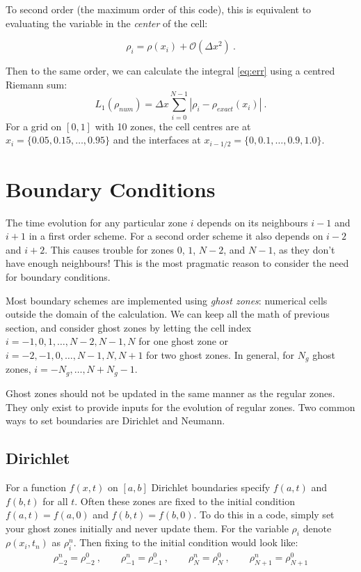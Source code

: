 \documentclass{article}
\begin{document}
To second order (the maximum order of this code), this is equivalent to evaluating the variable in the \emph{center} of the cell:

\begin{equation}
	\rho_i = \rho\left(x_i \right) + \mathcal{O}\left(\Delta x^2\right)\ .
\end{equation}

Then to the same order, we can calculate the integral \eqref{eq:err} using a centred Riemann sum:
\begin{equation}
	L_1(\rho_{num}) = \Delta x \sum_{i=0}^{N-1} \left| \rho_i - \rho_{exact}\left(x_i\right)\right| \ .
\end{equation}
For a grid on $[0,1]$ with 10 zones, the cell centres are at $x_i = \{ 0.05, 0.15, \dots, 0.95\}$ and the interfaces at $x_{i-1/2} = \{0,0.1,\dots, 0.9, 1.0 \}$.

\section{Boundary Conditions}

The time evolution for any particular zone $i$ depends on its neighbours $i-1$ and $i+1$ in a first order scheme.  For a second order scheme it also depends on $i-2$ and $i+2$.  This causes trouble for zones $0$, $1$, $N-2$, and $N-1$, as they don't have enough neighbours!  This is the most pragmatic reason to consider the need for boundary conditions.

Most boundary schemes are implemented using \emph{ghost zones}: numerical cells outside the domain of the calculation.  We can keep all the math of previous section, and consider ghost zones by letting the cell index $i = -1,0,1,\dots,N-2,N-1,N$ for one ghost zone or $i = -2,-1,0,\dots,N-1,N,N+1$ for two ghost zones.  In general, for $N_g$ ghost zones, $i=-N_g, \dots, N+N_g-1$.

Ghost zones should not be updated in the same manner as the regular zones. They only exist to provide inputs for the evolution of regular zones. Two common ways to set boundaries are Dirichlet and Neumann.

\subsection{Dirichlet}

For a function $f(x,t)$ on $[a,b]$ Dirichlet boundaries specify $f(a,t)$ and $f(b,t)$ for all $t$. Often these zones are fixed to the initial condition $f(a,t) =f(a,0)$ and $f(b,t) = f(b,0)$.  To do this in a code, simply set your ghost zones initially and never update them.  For the variable $\rho_i$ denote $\rho(x_i,t_n)$ as $\rho_i^n$.  Then fixing to the initial condition would look like:
\begin{align}
	\rho_{-2}^n = \rho_{-2}^0\ , \qquad \rho_{-1}^n = \rho_{-1}^0\ , \qquad \rho_{N}^n = \rho_{N}^0\ , \qquad \rho_{N+1}^n = \rho_{N+1}^0
\end{align}
\end{document}

